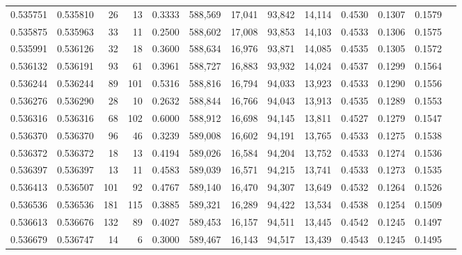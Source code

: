 \begin{tabular}{rrrrrrrrrrrrr}
0.535751 & 0.535810 &    26 &    13 &                                     0.3333 & 588,569 &  17,041 &  93,842 &  14,114 & 0.4530 & 0.1307 & 0.1579 \\
0.535875 & 0.535963 &    33 &    11 &                                     0.2500 & 588,602 &  17,008 &  93,853 &  14,103 & 0.4533 & 0.1306 & 0.1575 \\
0.535991 & 0.536126 &    32 &    18 &                                     0.3600 & 588,634 &  16,976 &  93,871 &  14,085 & 0.4535 & 0.1305 & 0.1572 \\
0.536132 & 0.536191 &    93 &    61 &                                     0.3961 & 588,727 &  16,883 &  93,932 &  14,024 & 0.4537 & 0.1299 & 0.1564 \\
0.536244 & 0.536244 &    89 &   101 &                                     0.5316 & 588,816 &  16,794 &  94,033 &  13,923 & 0.4533 & 0.1290 & 0.1556 \\
0.536276 & 0.536290 &    28 &    10 &                                     0.2632 & 588,844 &  16,766 &  94,043 &  13,913 & 0.4535 & 0.1289 & 0.1553 \\
0.536316 & 0.536316 &    68 &   102 &                                     0.6000 & 588,912 &  16,698 &  94,145 &  13,811 & 0.4527 & 0.1279 & 0.1547 \\
0.536370 & 0.536370 &    96 &    46 &                                     0.3239 & 589,008 &  16,602 &  94,191 &  13,765 & 0.4533 & 0.1275 & 0.1538 \\
0.536372 & 0.536372 &    18 &    13 &                                     0.4194 & 589,026 &  16,584 &  94,204 &  13,752 & 0.4533 & 0.1274 & 0.1536 \\
0.536397 & 0.536397 &    13 &    11 &                                     0.4583 & 589,039 &  16,571 &  94,215 &  13,741 & 0.4533 & 0.1273 & 0.1535 \\
0.536413 & 0.536507 &   101 &    92 &                                     0.4767 & 589,140 &  16,470 &  94,307 &  13,649 & 0.4532 & 0.1264 & 0.1526 \\
0.536536 & 0.536536 &   181 &   115 &                                     0.3885 & 589,321 &  16,289 &  94,422 &  13,534 & 0.4538 & 0.1254 & 0.1509 \\
0.536613 & 0.536676 &   132 &    89 &                                     0.4027 & 589,453 &  16,157 &  94,511 &  13,445 & 0.4542 & 0.1245 & 0.1497 \\
0.536679 & 0.536747 &    14 &     6 &                                     0.3000 & 589,467 &  16,143 &  94,517 &  13,439 & 0.4543 & 0.1245 & 0.1495 \\

\end{tabular}
